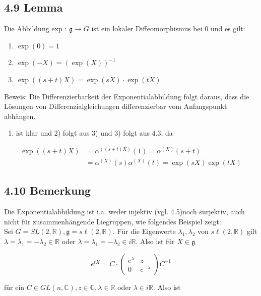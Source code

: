 \documentclass[10pt, letterpaper]{article}
\begin{document}
\subsection*{4.9 Lemma}
Die Abbildung exp : $\mathfrak{g} \rightarrow G$ ist ein lokaler Diffeomorphismus bei 0 und es gilt:

\begin{enumerate}
  \item $\exp (0)=1$
  \item $\exp (-X)=(\exp (X))^{-1}$
  \item $\exp ((s+t) X)=\exp (s X) \cdot \exp (t X)$
\end{enumerate}

Beweis: Die Differenzierbarkeit der Exponentialabbildung folgt daraus, dass die Lösungen von Differenzialgleichungen differenzierbar vom Anfangspunkt abhängen.

\begin{enumerate}
  \item ist klar und 2) folgt aus 3) und 3) folgt aus 4.3, da
\end{enumerate}

$$
\begin{aligned}
\exp ((s+t) X) & =\alpha^{((s+t) X)}(1)=\alpha^{(X)}(s+t) \\
& =\alpha^{(X)}(s) \alpha^{(X)}(t)=\exp (s X) \exp (t X)
\end{aligned}
$$

\subsection*{4.10 Bemerkung}
Die Exponentialabbildung ist i.a. weder injektiv (vgl. 4.5)noch surjektiv, auch nicht für zusammenhängende Liegruppen, wie folgendes Beispiel zeigt:\\
Sei $G=S L(2, \mathbb{R}), \mathfrak{g}=s \ell(2, \mathbb{R})$. Für die Eigenwerte $\lambda_{1}, \lambda_{2}$ von $s \ell(2, \mathbb{R})$ gilt $\lambda=\lambda_{1}=-\lambda_{2} \in \mathbb{R}$ oder $\lambda=\lambda_{1}=-\lambda_{2} \in i \mathbb{R}$. Also ist für $X \in \mathfrak{g}$

$$
e^{t X}=C \cdot\left(\begin{array}{cc}
e^{\lambda} & z \\
0 & e^{-\lambda}
\end{array}\right) C^{-1}
$$

für ein $C \in G L(n, \mathbb{C}), z \in \mathbb{C}, \lambda \in \mathbb{R}$ oder $\lambda \in i \mathbb{R}$. Also ist
\end{document}
